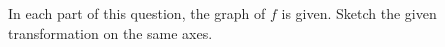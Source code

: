 \documentclass[12pt, addpoints]{exam/exam}
\newcommand{\1}{^{-1}}
\theoremstyle{plain}
\begin{document}
\begin{questions}
\question%
In each part of this question, the graph of $f$ is given.  Sketch the given transformation on the same axes. 
\begin{multicols}{2}
\end{multicols}
\end{questions}
\end{document}
